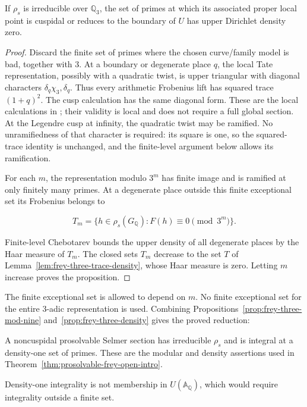 \begin{proposition}\label{prop:frey-three-density} If \(\rho_s\) is irreducible over
\(\mathbb Q_3\), the set of primes at which its associated proper local
point is cuspidal or reduces to the boundary of \(U\) has upper
Dirichlet density zero.

\end{proposition}\begin{proof} Discard the finite set of primes where the chosen
curve/family model is bad, together with 3. At a boundary or degenerate
place \(q\), the local Tate representation, possibly with a quadratic
twist, is upper triangular with diagonal characters
\(\delta_q\chi_3,\delta_q\). Thus every arithmetic Frobenius lift has
squared trace \((1+q)^2\). The cusp calculation has the same diagonal
form. These are the local calculations in \citet[\S4.3, author pp.~7--8]{Stix2015};
their validity is local and does not require a full global section. At the Legendre cusp at infinity, the quadratic twist may be ramified. No unramifiedness of that character is required: its square is one, so the squared-trace identity is unchanged, and the finite-level argument below allows its ramification.

For each \(m\), the representation modulo \(3^m\) has finite image and
is ramified at only finitely many primes. At a degenerate place outside
this finite exceptional set its Frobenius belongs to

\[
T_m=\{h\in \rho_s(G_{\mathbb Q}) :
 F(h)\equiv0\pmod {3^m}\}.
\]

Finite-level Chebotarev bounds the upper density of all degenerate
places by the Haar measure of \(T_m\). The closed sets \(T_m\) decrease
to the set \(T\) of Lemma~\ref{lem:frey-three-trace-density}, whose Haar measure is zero. Letting \(m\)
increase proves the proposition.
\end{proof}

The finite exceptional set is allowed to depend on \(m\). No finite
exceptional set for the entire 3-adic representation is used. Combining
Propositions~\ref{prop:frey-three-mod-nine} and~\ref{prop:frey-three-density} gives the proved reduction:

A noncuspidal prosolvable Selmer section has irreducible $\rho_s$
and is integral at a density-one set of primes. These are the modular
and density assertions used in Theorem~\ref{thm:prosolvable-frey-open-intro}.

Density-one integrality is not membership in
\(U(\mathbb A_{\mathbb Q})\), which would require integrality outside a
finite set.

